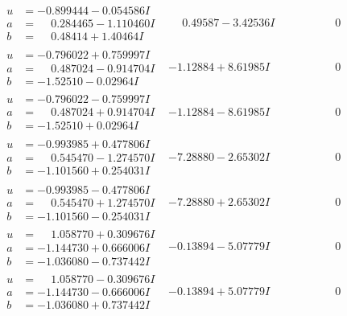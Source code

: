\documentclass[1p]{elsarticle_modified}
\theoremstyle{definition}
\begin{document}
$$\begin{array}{c|c|c}
\begin{aligned}
u &= -0.899444 - 0.054586 I \\
a &= \phantom{-}0.284465 - 1.110460 I \\
b &= \phantom{-}0.48414 + 1.40464 I\end{aligned}
 & \phantom{-}0.49587 - 3.42536 I & \phantom{-0.000000 } 0 \\ \hline\begin{aligned}
u &= -0.796022 + 0.759997 I \\
a &= \phantom{-}0.487024 - 0.914704 I \\
b &= -1.52510 - 0.02964 I\end{aligned}
 & -1.12884 + 8.61985 I & \phantom{-0.000000 } 0 \\ \hline\begin{aligned}
u &= -0.796022 - 0.759997 I \\
a &= \phantom{-}0.487024 + 0.914704 I \\
b &= -1.52510 + 0.02964 I\end{aligned}
 & -1.12884 - 8.61985 I & \phantom{-0.000000 } 0 \\ \hline\begin{aligned}
u &= -0.993985 + 0.477806 I \\
a &= \phantom{-}0.545470 - 1.274570 I \\
b &= -1.101560 + 0.254031 I\end{aligned}
 & -7.28880 - 2.65302 I & \phantom{-0.000000 } 0 \\ \hline\begin{aligned}
u &= -0.993985 - 0.477806 I \\
a &= \phantom{-}0.545470 + 1.274570 I \\
b &= -1.101560 - 0.254031 I\end{aligned}
 & -7.28880 + 2.65302 I & \phantom{-0.000000 } 0 \\ \hline\begin{aligned}
u &= \phantom{-}1.058770 + 0.309676 I \\
a &= -1.144730 + 0.666006 I \\
b &= -1.036080 - 0.737442 I\end{aligned}
 & -0.13894 - 5.07779 I & \phantom{-0.000000 } 0 \\ \hline\begin{aligned}
u &= \phantom{-}1.058770 - 0.309676 I \\
a &= -1.144730 - 0.666006 I \\
b &= -1.036080 + 0.737442 I\end{aligned}
 & -0.13894 + 5.07779 I & \phantom{-0.000000 } 0 \\ \hline\begin{aligned}

\end{aligned}
\end{array}$$
\end{document}
